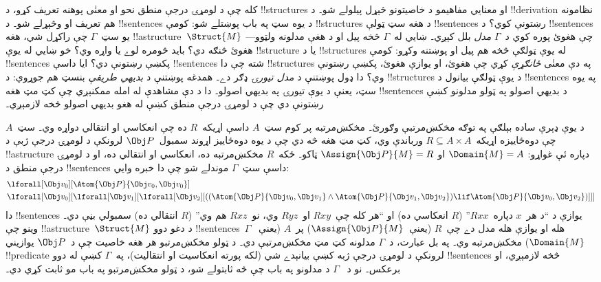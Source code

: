\documentclass[../../../include/open-logic-section]{subfiles}
\begin{document}


کله چې د لومړۍ درجې منطق نحو او معنٰی پوهنه تعريف کړو، د
!!{structure}s او معنايي مفاهيمو د خاصيتونو څېړل پيلولے شو۔ د
!!{derivation} نظامونه هم تعريف او وڅېړلے شو۔ د !!{sentence}s د
يوه سټ په باب پوښتلے شو: کومې !!{structure}s د هغه سټ ټولې
!!{sentence}s رښتونې کوي؟ د !!{sentence}s يو سټ~$\Gamma$ چې راکړل
شي، هغه !!a{structure}~$\Struct{M}$ چې هغوئ پوره کوي د~$\Gamma$
\emph{مدل} بلل کېږي۔ ښايي له~$\Gamma$ څخه پيل او د هغې مدلونه
ولټوو---هغوئ څنګه دي؟ بايد څومره لوے يا واړه وي؟ خو ښايي له يوې
!!{structure} يا د !!{structure}s له يوې ټولګې څخه هم پيل او
پوښتنه وکړو: کومې !!{sentence}s پکښې رښتونې دي؟ ايا داسې
!!{sentence}s شته چې دا !!{structure}s په دې معنٰی
\emph{ځانګړې} کړي چې هغوئ، او يوازې هغوئ، پکښې رښتونې وي؟ دا ډول
پوښتنې د \emph{مدل تيورۍ} ډګر دے۔ همدغه پوښتنې د \emph{بديهي
طريقې} بنسټ هم جوړوي: د !!{structure}s د يوې ټولګې بيانول د
!!{sentence}s په يوه سټ، يعنې د يوې تيورۍ په بديهي اصولو۔ دا د دې
مشاهدې له امله ممکنېږي چې کټ مټ هغه !!{sentence}s د بديهي اصولو په
ټولو مدلونو کښې رښتونې دي چې د لومړۍ درجې منطق کښې له هغو بديهي
اصولو څخه لازمېږي۔

د يوې ډېرې ساده بېلګې په توګه مخکښ‌مرتبې وګورئ۔ مخکښ‌مرتبه پر کوم
سټ~$A$ داسې اړيکه~$R$ ده چې انعکاسي او انتقالي دواړه وي۔ سټ~$A$
چې دوه‌ځاييزه اړيکه~$R \subseteq A \times A$ ورباندې وي، کټ مټ
هغه څه دي چې د يوه دوه‌ځاييز اړوند سمبول~$\Obj P$ لرونکې د لومړۍ
درجې ژبې د !!a{structure} دپاره ئې غواړو: $\Domain{M} = A$ او
$\Assign{\Obj P}{M} = R$ ټاکو۔ ځکه~$R$ مخکښ‌مرتبه ده، انعکاسي او
انتقالي ده، او د لومړۍ درجې منطق د !!{sentence}s داسې سټ~$\Gamma$
موندلے شو چې دا خبره وايي:
\begin{align*}
  & \lforall[\Obj v_0][\Atom{\Obj P}{\Obj v_0,\Obj v_0}]\\
  & \lforall[\Obj v_0][\lforall[\Obj v_1][\lforall[\Obj v_2][((\Atom{\Obj P}{\Obj v_0,\Obj v_1} \land \Atom{\Obj P}{\Obj v_1,\Obj v_2}) \lif \Atom{\Obj P}{\Obj v_0,\Obj v_2})]]]
\end{align*}
دا !!{sentence}s يوازې د ``د هر~$x$ دپاره~$Rxx$'' ($R$ انعکاسي
ده) او ``هر کله چې~$Rxy$ او~$Ryz$ وي، نو~$Rxz$ هم وي'' ($R$
انتقالي ده) سمبولي بڼې دي۔ وينو چې !!a{structure}~$\Struct{M}$ د
دغو دوو !!{sentence}s~$\Gamma$ هله او يوازې هله مدل دے چې~$R$
(يعنې~$\Assign{\Obj P}{M}$) پر~$A$ (يعنې~$\Domain{M}$) مخکښ‌مرتبه
وي۔ په بل عبارت، د~$\Gamma$ مدلونه کټ مټ مخکښ‌مرتبې دي۔ د ټولو
مخکښ‌مرتبو هر هغه خاصيت چې د~$\Obj P$ يوازيني !!{predicate} لرونکې
د لومړۍ درجې ژبه کښې بيانېدے شي (لکه پورته انعکاسيت او انتقاليت)،
په~$\Gamma$ کښې له دوو !!{sentence}s څخه لازمېږي، او برعکس۔ نو د
~$\Gamma$ د مدلونو په باب چې څه ثابتولے شو، د ټولو مخکښ‌مرتبو په
باب مو ثابت کړي دي۔
\end{document}

